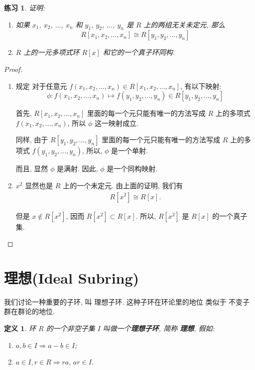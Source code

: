 \documentclass[utf8]{ctexbook}
\newtheorem{definition}{定义}[section]
\newtheorem{exercise}{练习}[section]
\begin{document}
\begin{exercise}
证明:
\begin{enumerate}
\item{如果 $x_1$, $x_2$, $\ldots$, $x_n$ 和 $y_1$, $y_2$, $\ldots$, $y_n$ 是 $R$ 上的两组无关未定元, 那么
\begin{equation}
R[x_1, x_2, \ldots, x_n] \cong R[y_1, y_2, \ldots, y_n]
\end{equation}
}
\item{$R$ 上的一元多项式环 $R[x]$ 和它的一个真子环同构.}
\end{enumerate}
\end{exercise}

\begin{proof}
\begin{enumerate}
\item{规定 对于任意元 $f(x_1, x_2, \ldots , x_n) \in R[x_1, x_2, \ldots, x_n]$, 有以下映射:
\begin{equation}
\phi: f(x_1, x_2, \ldots, x_n) \mapsto f(y_1, y_2, \ldots, y_n) \in R[y_1, y_2, \ldots, y_n] \nonumber
\end{equation}

首先, $R[x_1, x_2, \ldots, x_n]$ 里面的每一个元只能有唯一的方法写成 $R$ 上的多项式 $ f(x_1, x_2, \ldots, x_n)$, 所以 $\phi$ 这一映射成立.

同样, 由于 $R[y_1, y_2, \ldots, y_n]$ 里面的每一个元只能有唯一的方法写成 $R$ 上的多项式 $ f(y_1, y_2, \ldots, y_n)$, 所以, $\phi$ 是一个单射.

而且, 显然 $\phi$ 是满射. 因此, $\phi$ 是一个同构映射.}
\item{$x^2$ 显然也是 $R$ 上的一个未定元. 由上面的证明, 我们有
\begin{align*}
R[x^2] \cong R[x] .
\end{align*}

但是 $x \not \in R[x^2]$, 因而 $R[x^2] \subset R[x]$. 所以, $R[x^2]$ 是 $R[x]$ 的一个真子集.

}
\end{enumerate}
\end{proof}

\section{理想(Ideal Subring)}

我们讨论一种重要的子环, 叫 理想子环. 这种子环在环论里的地位 类似于 不变子群在群论的地位.

\begin{definition}\label{def_ideal}
环 $R$ 的一个非空子集 $I$ 叫做一个\textbf{理想子环}, 简称 \textbf{理想}, 假如:
\begin{enumerate}
\item{$a, b \in I \Longrightarrow a - b \in I$;}
\item{$a \in I, r \in R \Longrightarrow ra, \, ar \in I$.\label{def_ideal_condition_2}}
\end{enumerate}
\end{definition}
\end{document}
